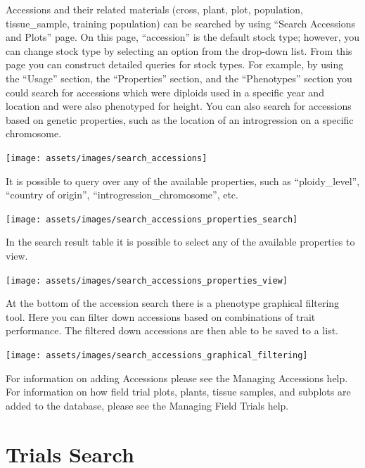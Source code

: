 \documentclass[
  12pt,
]{book}
\begin{document}
Accessions and their related materials (cross, plant, plot, population, tissue\_sample, training population) can be searched by using ``Search Accessions and Plots'' page. On this page, ``accession'' is the default stock type; however, you can change stock type by selecting an option from the drop-down list. From this page you can construct detailed queries for stock types. For example, by using the ``Usage'' section, the ``Properties'' section, and the ``Phenotypes'' section you could search for accessions which were diploids used in a specific year and location and were also phenotyped for height. You can also search for accessions based on genetic properties, such as the location of an introgression on a specific chromosome.

\begin{center}\texttt{[image: assets/images/search\_accessions]} \end{center}

It is possible to query over any of the available properties, such as ``ploidy\_level'', ``country of origin'', ``introgression\_chromosome'', etc.

\begin{center}\texttt{[image: assets/images/search\_accessions\_properties\_search]} \end{center}

In the search result table it is possible to select any of the available properties to view.

\begin{center}\texttt{[image: assets/images/search\_accessions\_properties\_view]} \end{center}

At the bottom of the accession search there is a phenotype graphical filtering tool. Here you can filter down accessions based on combinations of trait performance. The filtered down accessions are then able to be saved to a list.

\begin{center}\texttt{[image: assets/images/search\_accessions\_graphical\_filtering]} \end{center}

For information on adding Accessions please see the Managing Accessions help. For information on how field trial plots, plants, tissue samples, and subplots are added to the database, please see the Managing Field Trials help.

\hypertarget{trials-search}{%
\section{Trials Search}\label{trials-search}}
\end{document}
